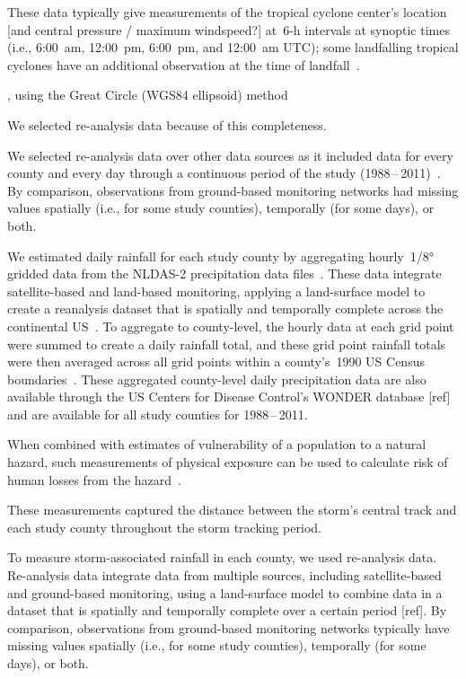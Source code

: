 These data typically give measurements of
the tropical cyclone center's location [and central pressure / maximum
windspeed?] at~6-\si{\hour} intervals at synoptic times (i.e., 6:00~am,
12:00~pm, 6:00~pm, and 12:00~am \ac{UTC}); some landfalling tropical cyclones
have an additional observation at the time of landfall~\parencite{landsea2013}.

, using the Great Circle %
(WGS84 ellipsoid) method

We selected re-analysis data because of
this completeness. 

We selected re-analysis data over other data
sources as it included data for every county and every day through a continuous
period of the study (1988\,--\,2011)~\parencite{alhamdan2014environmental,
cdcwonder}. By comparison, observations from ground-based monitoring networks
had missing values spatially (i.e., for some study counties), temporally (for
some days), or both.  

We estimated daily rainfall for each study county by aggregating
hourly~1/8\si{\degree} gridded data from the \ac{NLDAS-2} precipitation data
files~\parencite{rui2013nldas}. These data integrate satellite-based and
land-based monitoring, applying a land-surface model to create a reanalysis
dataset that is spatially and temporally complete across the continental
\ac{US}~\parencite{rui2013nldas, alhamdan2014environmental}. To aggregate to
county-level, the hourly data at each grid point were summed to create a daily
rainfall total, and these grid point rainfall totals were then averaged across
all grid points within a county's~1990 \ac{US} Census
boundaries~\parencite{alhamdan2014environmental, cdcwonder}. These aggregated
county-level daily precipitation data are also available through the \ac{US}
Centers for Disease Control's WONDER database [ref] and are available for all
study counties for 1988\,--\,2011.

When combined with estimates of vulnerability of a
population to a natural hazard, such measurements of physical exposure can be
used to calculate risk of human losses from the
hazard~\parencite{peduzzi2009assessing}.

These measurements
captured the distance between the storm's central track and each study county
throughout the storm tracking period. 

To measure storm-associated rainfall in each county, we used re-analysis data.
Re-analysis data integrate data from multiple sources, including
satellite-based and ground-based monitoring, using a land-surface model to
combine data in a dataset that is spatially and temporally complete over a
certain period [ref]. By comparison, observations from ground-based monitoring
networks typically have missing values spatially (i.e., for some study
counties), temporally (for some days), or both. 

